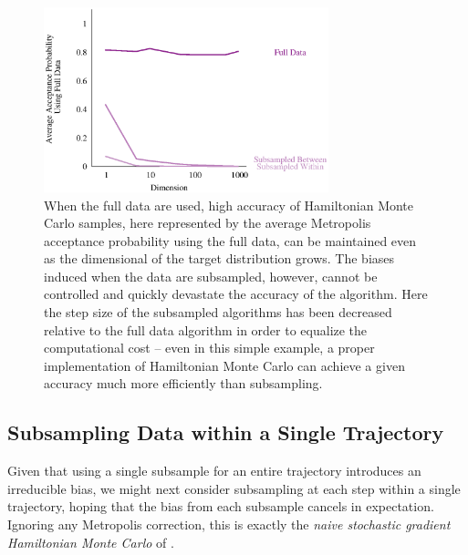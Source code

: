 \documentclass{article}
\begin{document}
\begin{figure}
\centering
\includegraphics[width=3.25in]{multivariate.eps}
\caption{When the full data are used, high accuracy of Hamiltonian Monte Carlo samples, 
here represented by the average Metropolis acceptance probability using the full data, can 
be maintained even as the dimensional of the target distribution grows.  The biases induced 
when the data are subsampled, however, cannot be controlled and quickly devastate the 
accuracy of the algorithm.  Here the step size of the subsampled algorithms has been decreased
relative to the full data algorithm in order to equalize the computational cost -- even in this
simple example, a proper implementation of Hamiltonian Monte Carlo can achieve a given
accuracy much more efficiently than subsampling.}
\label{fig:multivariate}
\end{figure}

\subsection{Subsampling Data within a Single Trajectory}

Given that using a single subsample for an entire trajectory introduces an
irreducible bias, we might next consider subsampling at each step within
a single trajectory, hoping that the bias from each subsample cancels
in expectation.  Ignoring any Metropolis correction, this is exactly the
\textit{naive stochastic gradient Hamiltonian Monte Carlo} of \cite{ChenEtAl:2014}.
\end{document}
